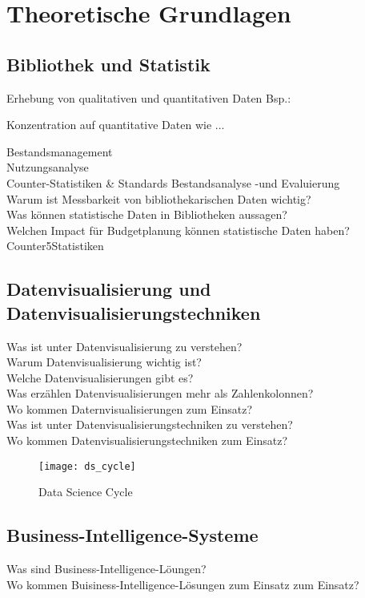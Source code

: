 \chapter{Theoretische Grundlagen}
\label{chap:two}
\section{Bibliothek und Statistik}
\label{chap:two_one}

Erhebung von qualitativen und quantitativen Daten
Bsp.:

Konzentration auf quantitative Daten wie ...

Bestandsmanagement\\
Nutzungsanalyse\\
Counter-Statistiken \& Standards
Bestandsanalyse -und Evaluierung\\

Warum ist Messbarkeit von bibliothekarischen Daten wichtig?\\
Was können statistische Daten in Bibliotheken aussagen?\\
Welchen Impact für Budgetplanung können statistische Daten haben?\\

Counter5Statistiken
\section{Datenvisualisierung und Datenvisualisierungstechniken}
Was ist unter Datenvisualisierung zu verstehen?\\
Warum Datenvisualisierung wichtig ist?\\
Welche Datenvisualisierungen gibt es?\\
Was erzählen Datenvisualisierungen mehr als Zahlenkolonnen?\\
Wo kommen Daternvisualisierungen zum Einsatz?\\
Was ist unter Datenvisualisierungstechniken zu verstehen?\\
Wo kommen Datenvisualisierungstechniken zum Einsatz?


\begin{figure}[ht]
    \centering
        \texttt{[image: ds\_cycle]}
        \caption{Data Science Cycle}
        \label{fig:data science}
\end{figure}




\section{Business-Intelligence-Systeme}

Was sind Business-Intelligence-Löungen?\\
Wo kommen Buisiness-Intelligence-Lösungen zum Einsatz zum Einsatz?
